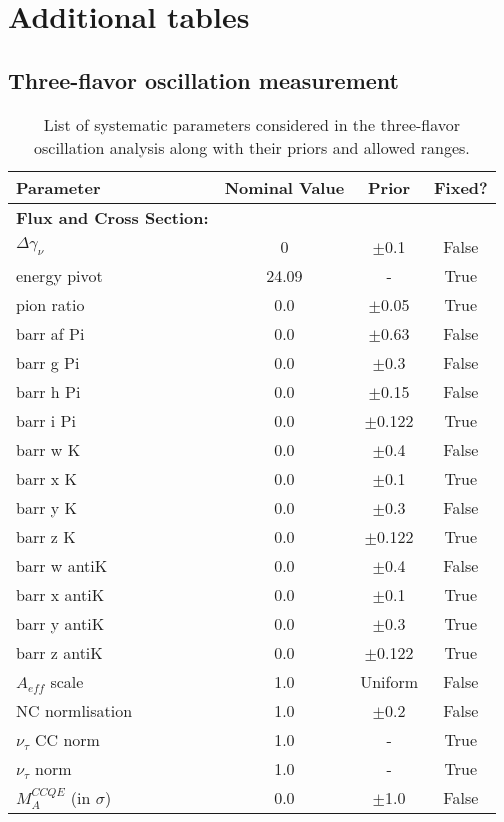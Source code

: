 \chapter{Additional tables}
\label{ch:tables}

\section{Three-flavor oscillation measurement}

\begin{table}[htb]
  \centering
  \caption{List of systematic parameters considered in the three-flavor oscillation analysis along with their priors and allowed ranges.}
  \label{tab:sys-params-three-flavor}
\begin{tabular}{lccc} \toprule
\hline
Parameter  & Nominal Value & Prior & Fixed? \\ \hline
\textbf{Flux and Cross Section:}   &     &    \\
$\Delta \gamma_\nu$ & 0 & $\pm$0.1 & False \\
energy pivot & 24.09 & - &  True \\
pion ratio & 0.0 & $\pm$0.05 & True \\
barr af Pi & 0.0  & $\pm$0.63 & False \\
barr g Pi & 0.0  & $\pm$0.3 & False \\
barr h Pi & 0.0  & $\pm$0.15 & False \\
barr i Pi  & 0.0  & $\pm$0.122 & True \\
barr w K & 0.0  & $\pm$0.4 & False \\
barr x K & 0.0  & $\pm$0.1 & True \\
barr y K & 0.0  & $\pm$0.3 & False \\
barr z K & 0.0  & $\pm$0.122 & True \\
barr w antiK & 0.0  & $\pm$0.4 & False \\
barr x antiK & 0.0  & $\pm$0.1 & True \\
barr y antiK & 0.0  & $\pm$0.3 & True \\
barr z antiK & 0.0  & $\pm$0.122 & True \\ \hline
$A_{eff}$ scale & 1.0 & Uniform & False \\
NC normlisation & 1.0 & $\pm$0.2 & False\\
$\nu_{\tau}$ CC norm & 1.0 & - & True\\
$\nu_{\tau}$ norm & 1.0 & - & True\\
$M_{A}^{CCQE}$ (in $\sigma$)& 0.0 & $\pm$1.0 & False  \\

\end{tabular}
\end{table}
